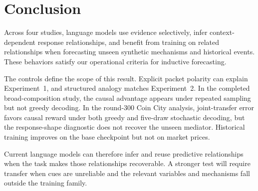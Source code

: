 \section{Conclusion}

Across four studies, language models use evidence selectively, infer
context-dependent response relationships, and benefit from training on related
relationships when forecasting unseen synthetic mechanisms and historical events.
These behaviors satisfy our operational criteria for inductive forecasting.

The controls define the scope of this result. Explicit packet polarity can explain
Experiment~1, and structured analogy matches Experiment~2. In the completed
broad-composition study, the causal advantage appears under repeated sampling but
not greedy decoding. In the round-300 Coin City analysis, joint-transfer error
favors causal reward under both greedy and
five-draw stochastic decoding, but the response-shape diagnostic does not recover
the unseen mediator. Historical training improves on the base checkpoint but not
on market prices.

Current language models can therefore infer and reuse predictive relationships when
the task makes those relationships recoverable. A stronger test will require
transfer when cues are unreliable and the relevant variables and mechanisms fall
outside the training family.
